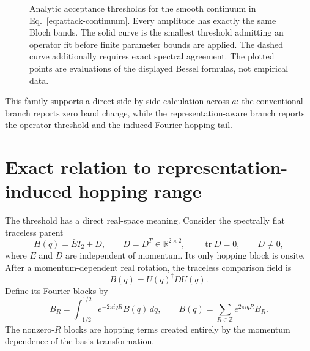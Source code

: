 \documentclass[11pt]{article}
\begin{document}
\begin{figure}[htbp]
\centering
{}
\caption{Analytic acceptance thresholds for the smooth continuum in
Eq.~\eqref{eq:attack-continuum}. Every amplitude has exactly the same Bloch bands. The
solid curve is the smallest threshold admitting an operator fit before finite parameter
bounds are applied. The dashed curve additionally requires exact spectral agreement.
The plotted points are evaluations of the displayed Bessel formulas, not empirical
data.}
\label{fig:threshold-continuum}
\end{figure}

This family supports a direct side-by-side calculation across $a$: the conventional
branch reports zero band change, while the representation-aware branch reports the
operator threshold and the induced Fourier hopping tail.

\section{Exact relation to representation-induced hopping range}

The threshold has a direct real-space meaning. Consider the spectrally flat traceless
parent
\begin{equation}
 H(q)=\bar E I_2+D,
 \qquad D=D^T\in\mathbb R^{2\times2},
 \qquad \operatorname{tr}D=0,
 \qquad D\ne0,
 \label{eq:flat-traceless-parent}
\end{equation}
where $\bar E$ and $D$ are independent of momentum. Its only hopping block is onsite.
After a momentum-dependent real rotation, the traceless comparison field is
\begin{equation}
 B(q)=U(q)^\dagger D U(q).
 \label{eq:rotated-traceless-field}
\end{equation}
Define its Fourier blocks by
\begin{equation}
 B_R=\int_{-1/2}^{1/2}e^{-2\pi iqR}B(q)\,dq,
 \qquad
 B(q)=\sum_{R\in\mathbb Z}e^{2\pi iqR}B_R.
 \label{eq:continuous-traceless-fourier}
\end{equation}
The nonzero-$R$ blocks are hopping terms created entirely by the momentum dependence of
the basis transformation.
\end{document}
